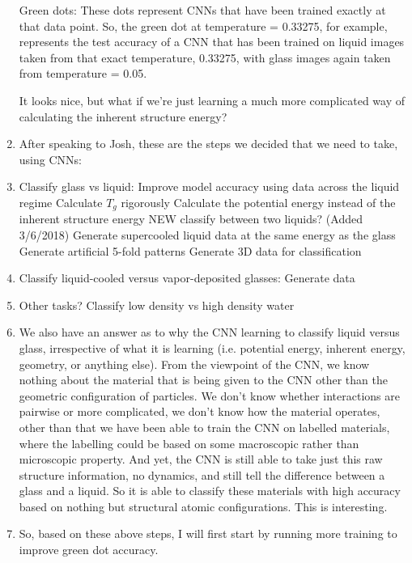 \documentclass[12pt,reqno]{amsart}
\numberwithin{equation}{section}
\begin{document}
\begin{enumerate}
Green dots:
These dots represent CNNs that have been trained exactly at that data point.  So, the green dot at temperature = 0.33275, for example, represents the test accuracy of a CNN that has been trained on liquid images taken from that exact temperature, 0.33275, with glass images again taken from temperature = 0.05.  

It looks nice, but what if we're just learning a much more complicated way of calculating the inherent structure energy?

\item After speaking to Josh, these are the steps we decided that we need to take, using CNNs:

\item Classify glass vs liquid:
\subitem Improve model accuracy using data across the liquid regime
\subitem Calculate $T_g$ rigorously
\subitem Calculate the potential energy instead of the inherent structure energy
\subitem NEW classify between two liquids? (Added 3/6/2018)
\subitem Generate supercooled liquid data at the same energy as the glass
\subitem Generate artificial 5-fold patterns
\subitem Generate 3D data for classification
\item Classify liquid-cooled versus vapor-deposited glasses:
\subitem Generate data
\item Other tasks?
\subitem Classify low density vs high density water

\item We also have an answer as to why the CNN learning to classify liquid versus glass, irrespective of what it is learning (i.e. potential energy, inherent energy, geometry, or anything else).  From the viewpoint of the CNN, we know nothing about the material that is being given to the CNN other than the geometric configuration of particles.  We don't know whether interactions are pairwise or more complicated, we don't know how the material operates, other than that we have been able to train the CNN on labelled materials, where the labelling could be based on some macroscopic rather than microscopic property.  And yet, the CNN is still able to take just this raw structure information, no dynamics, and still tell the difference between a glass and a liquid.  So it is able to classify these materials with high accuracy based on nothing but structural atomic configurations.  This is interesting.  

\item So, based on these above steps, I will first start by running more training to improve green dot accuracy.  


\end{enumerate}
\end{document}

